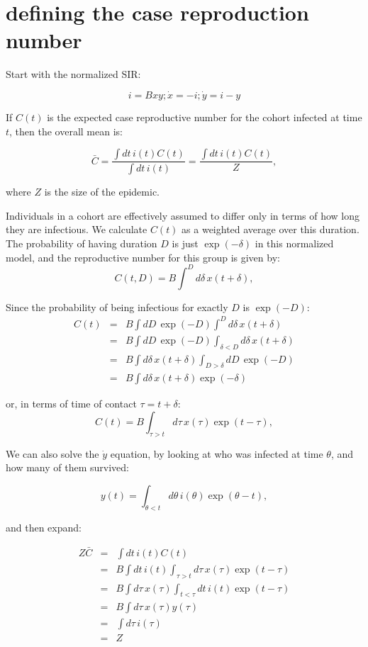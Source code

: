 \documentclass[12pt]{article}
\begin{document}
\section{defining the case reproduction number}
Start with the normalized SIR:

$$ i = Bxy; \dot x = -i; \dot y = i-y $$

If $C(t)$ is the expected case reproductive number for the cohort infected at time $t$, then the overall mean is:

$$
	\bar C
	= \frac{\int{dt\, i(t) C(t)}}{\int{dt\, i(t)}}
	= \frac{\int{dt\, i(t) C(t)}}{Z},
$$

where $Z$ is the size of the epidemic.

Individuals in a cohort are effectively assumed to differ only in terms of how long they are infectious. We calculate $C(t)$ as a weighted average over this duration. The probability of having duration $D$ is just $\exp(-\delta)$ in this normalized model, and the reproductive number for this group is given by:
$$C(t, D) = B \int^D{d\delta\, x(t+\delta)}, $$

Since the probability of being infectious for exactly $D$ is $\exp(-D)$:
\begin{eqnarray}
	C(t)
	&=& B \int{dD\, \exp(-D) \int^D{d\delta\, x(t+\delta)}}
	\\ &=& B \int{dD\, \exp(-D) \int_{\delta<D}{d\delta\, x(t+\delta)}}
	\\ &=& B \int{d\delta\, x(t+\delta)\int_{D>\delta}{dD\, \exp(-D) }}
	\\ &=& B \int{d\delta\, x(t+\delta) \exp(-\delta)}
\end{eqnarray}

or, in terms of time of contact $\tau=t+\delta$:
$$C(t) = B \int_{\tau>t}{d\tau\, x(\tau) \exp(t-\tau)}, $$

We can also solve the $\dot y$ equation, by looking at who was infected at time $\theta$, and how many of them survived:

$$ y(t) = \int_{\theta<t}{d\theta\, i(\theta)\exp(\theta-t)},$$

and then expand:

\begin{eqnarray}
	Z \bar C
	&=& \int{dt\, i(t) C(t)}
	\\ &=& B \int{dt\, i(t) \int_{\tau>t}{d\tau\, x(\tau) \exp(t-\tau)}}
	\\ &=& B \int{d\tau\, x(\tau) \int_{t<\tau}dt\, i(t) \exp(t-\tau)}
	\\ &=& B \int{d\tau\, x(\tau) y(\tau)}
	\\ &=& \int{d\tau\, i(\tau)}
	\\ &=& Z
\end{eqnarray}
\end{document}

